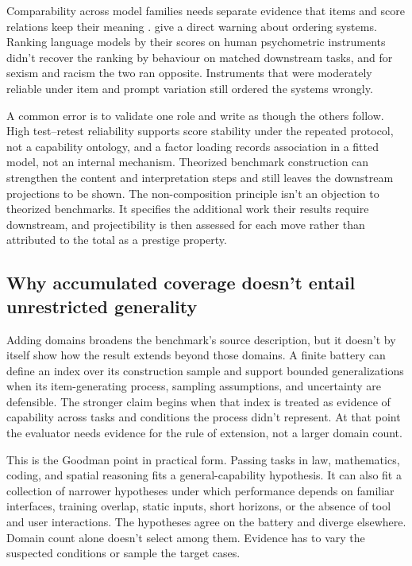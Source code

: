\documentclass[12pt]{article}
\begin{document}
Comparability across model families needs separate evidence that items and score relations keep their meaning \citep{meredith1993measurementInvariance}. \Textcite{jung2026psychometric} give a direct warning about ordering systems. Ranking language models by their scores on human psychometric instruments didn't recover the ranking by behaviour on matched downstream tasks, and for sexism and racism the two ran opposite. Instruments that were moderately reliable under item and prompt variation still ordered the systems wrongly.

A common error is to validate one role and write as though the others follow. High test--retest reliability supports score stability under the repeated protocol, not a capability ontology, and a factor loading records association in a fitted model, not an internal mechanism. Theorized benchmark construction can strengthen the content and interpretation steps \citep{barmanEtAl2024understanding} and still leaves the downstream projections to be shown. The non-composition principle isn't an objection to theorized benchmarks. It specifies the additional work their results require downstream, and projectibility is then assessed for each move rather than attributed to the total as a prestige property.

\subsection{Why accumulated coverage doesn't entail unrestricted generality}\label{ssec:coverage}

Adding domains broadens the benchmark's source description, but it doesn't by itself show how the result extends beyond those domains. A finite battery can define an index over its construction sample and support bounded generalizations when its item-generating process, sampling assumptions, and uncertainty are defensible. The stronger claim begins when that index is treated as evidence of capability across tasks and conditions the process didn't represent. At that point the evaluator needs evidence for the rule of extension, not a larger domain count.

This is the Goodman point in practical form. Passing tasks in law, mathematics, coding, and spatial reasoning fits a general-capability hypothesis. It can also fit a collection of narrower hypotheses under which performance depends on familiar interfaces, training overlap, static inputs, short horizons, or the absence of tool and user interactions. The hypotheses agree on the battery and diverge elsewhere. Domain count alone doesn't select among them. Evidence has to vary the suspected conditions or sample the target cases.
\end{document}
